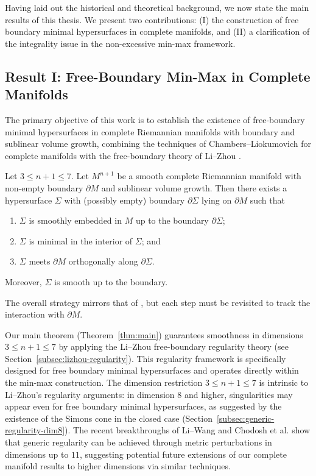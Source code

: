 Having laid out the historical and theoretical background, we now state the main results of this
thesis. We present two contributions: (I) the construction of free boundary minimal hypersurfaces
in complete manifolds, and (II) a clarification of the integrality issue in the non-excessive
min-max framework.

\subsection{Result I: Free-Boundary Min-Max in Complete Manifolds}

The primary objective of this work is to establish the existence of free-boundary minimal
hypersurfaces in complete Riemannian manifolds with boundary and sublinear volume growth, combining
the techniques of Chambers--Liokumovich \cite{CL20} for complete manifolds with the free-boundary
theory of Li--Zhou \cite{LZ17}.

\begin{theorem}\label{thm:main}
    Let $3 \leq n + 1 \leq 7$. Let $M^{n + 1}$ be a smooth complete Riemannian manifold with
    non-empty boundary $\partial M$ and sublinear volume growth. Then there exists a hypersurface
    $\Sigma$ with (possibly empty) boundary $\partial\Sigma$ lying on $\partial M$ such that
    \begin{enumerate}
        \item[(i)] $\Sigma$ is smoothly embedded in $M$ up to the boundary $\partial \Sigma$;
        \item[(ii)] $\Sigma$ is minimal in the interior of $\Sigma$; and
        \item[(iii)] $\Sigma$ meets $\partial M$ orthogonally along $\partial \Sigma$.
    \end{enumerate}
    Moreover, $\Sigma$ is smooth up to the boundary.
\end{theorem}

The overall strategy mirrors that of \cite{CL20}, but each step must be revisited to track the
interaction with $\partial M$.

\begin{remark}
Our main theorem (Theorem~\ref{thm:main}) guarantees smoothness in dimensions $3 \leq n+1 \leq 7$
by applying the Li--Zhou free-boundary regularity theory \cite{LZ17} (see
Section~\ref{subsec:lizhou-regularity}). This regularity framework is specifically designed for
free boundary minimal hypersurfaces and operates directly within the min-max construction. The
dimension restriction $3 \leq n+1 \leq 7$ is intrinsic to Li--Zhou's regularity arguments: in
dimension $8$ and higher, singularities may appear even for free boundary minimal hypersurfaces, as
suggested by the existence of the Simons cone in the closed case
(Section~\ref{subsec:generic-regularity-dim8}). The recent breakthroughs of Li--Wang
\cite{LiWang-dim8} and Chodosh et al. \cite{CMSW-dim11} show that generic regularity can be
achieved through metric perturbations in dimensions up to $11$, suggesting potential future
extensions of our complete manifold results to higher dimensions via similar techniques.
\end{remark}

